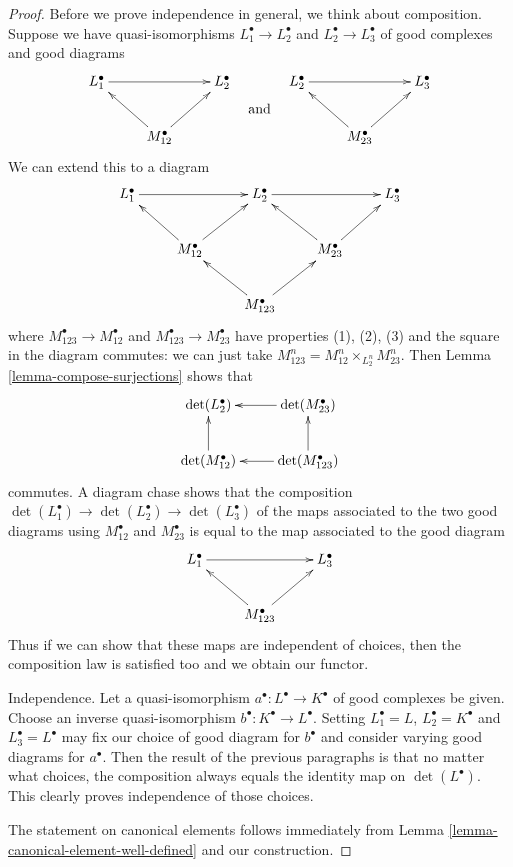\documentclass[10pt,a4paper]{amsart}
\theoremstyle{plain}
\theoremstyle{definition}
\theoremstyle{remark}
\numberwithin{equation}{subsection}
\begin{document}
\begin{proof}
\medskip\noindent
Before we prove independence in general, we think about
composition. Suppose we have quasi-isomorphisms
$L_1^\bullet \to L_2^\bullet$ and $L_2^\bullet \to L_3^\bullet$
of good complexes and good diagrams
$$
\vcenter{
\xymatrix{
L_1^\bullet \ar[rr] & &
L_2^\bullet \\
& M_{12}^\bullet \ar[lu] \ar[ru]
}
}
\quad\text{and}\quad
\vcenter{
\xymatrix{
L_2^\bullet \ar[rr] & &
L_3^\bullet \\
& M_{23}^\bullet \ar[lu] \ar[ru]
}
}
$$
We can extend this to a diagram
$$
\xymatrix{
L_1^\bullet \ar[rr] & &
L_2^\bullet \ar[rr] & &
L_3^\bullet \\
& M_{12}^\bullet \ar[lu] \ar[ru]
& & M_{23}^\bullet \ar[lu] \ar[ru] \\
& &
M_{123}^\bullet \ar[lu] \ar[ru]
}
$$
where $M_{123}^\bullet \to M_{12}^\bullet$ and
$M_{123}^\bullet \to M_{23}^\bullet$ have properties (1), (2), (3)
and the square in the diagram commutes: we can just take
$M_{123}^n = M_{12}^n \times_{L_2^n} M_{23}^n$.
Then Lemma \ref{lemma-compose-surjections} shows that
$$
\xymatrix{
\det(L_2^\bullet) &
\det(M_{23}^\bullet) \ar[l] \\
\det(M_{12}^\bullet) \ar[u] &
\det(M_{123}^\bullet) \ar[l] \ar[u]
}
$$
commutes. A diagram chase shows that the composition
$\det(L_1^\bullet) \to \det(L_2^\bullet) \to \det(L_3^\bullet)$
of the maps associated to the two good diagrams using
$M_{12}^\bullet$ and $M_{23}^\bullet$
is equal to the map associated to the good diagram
$$
\xymatrix{
L_1^\bullet \ar[rr] & & L_3^\bullet \\
& M_{123}^\bullet \ar[lu] \ar[ru]
}
$$
Thus if we can show that these maps are independent of choices,
then the composition law is satisfied too and we obtain our functor.

\medskip\noindent
Independence. Let a quasi-isomorphism
$a^\bullet : L^\bullet \to K^\bullet$ of good complexes be given.
Choose an inverse quasi-isomorphism $b^\bullet : K^\bullet \to L^\bullet$.
Setting $L_1^\bullet = L$, $L_2^\bullet = K^\bullet$ and
$L_3^\bullet = L^\bullet$ may fix our choice of good diagram for
$b^\bullet$ and consider varying good diagrams for $a^\bullet$.
Then the result of the previous paragraphs is that no matter
what choices, the composition always equals the identity
map on $\det(L^\bullet)$. This clearly proves independence of those choices.

\medskip\noindent
The statement on canonical elements follows immediately from
Lemma \ref{lemma-canonical-element-well-defined} and our construction.
\end{proof}
\end{document}
